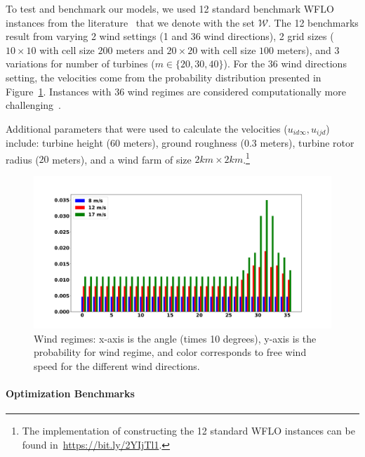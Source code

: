 \documentclass[preprint,12pt]{elsarticle}
\begin{document}
To test and benchmark our models, we used 12 standard benchmark WFLO instances
from the literature~\cite{MOSETTI1994105,Zhang2014,grady2005placement} that we denote with the set $\mathcal{W}$. 
The 12 benchmarks result from varying 2 wind settings (1 and 36 wind directions),
2 grid sizes ($10\times10$ with cell size $200$ meters and $20\times20$ with cell size $100$ meters),
and 3 variations for number of turbines ($m \in \{20, 30, 40\}$). 
For the $36$ wind directions setting, the velocities come from the probability distribution presented in Figure~\ref{fig:prob_wind}.
Instances with $36$ wind regimes are considered computationally more challenging~\cite{Zhang2014}.

Additional parameters that were used to calculate 
the velocities ($u_{id\infty}, u_{ijd}$) include: turbine height ($60$ meters),
ground roughness ($0.3$ meters), turbine rotor radius ($20$ meters), and a wind farm of size $2km \times 2km$.\footnote{The implementation of constructing the 12 standard WFLO instances can be found in~\url{https://bit.ly/2YIjTl1}.}


\begin{figure}[t]
	\centering
	\includegraphics[scale = 0.3]{prob_wind_pdf.pdf}
	
	\caption{Wind regimes: x-axis is the angle (times 10 degrees), y-axis is the probability for wind regime, and color corresponds to free wind speed for the different wind directions.}\label{fig:prob_wind}
\end{figure}

\paragraph{Optimization Benchmarks}
\end{document}
